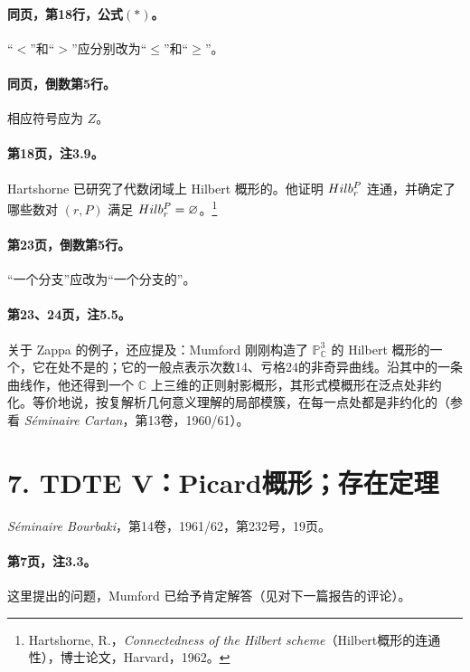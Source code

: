 \paragraph{同页，第18行，公式$(*)$。}“$<$”和“$>$”应分别改为“$\le$”和“$\ge$”。

\paragraph{同页，倒数第5行。}相应符号应为 $Z$。

\paragraph{第18页，注3.9。}Hartshorne 已研究了代数闭域上 Hilbert 概形的。他证明 $Hilb_r^P$ 连通，并确定了哪些数对 $(r,P)$ 满足 $Hilb_r^P=\varnothing$。\footnote{Hartshorne, R.，\textit{Connectedness of the Hilbert scheme}（Hilbert概形的连通性），博士论文，Harvard，1962。}

\paragraph{第23页，倒数第5行。}“一个分支”应改为“一个分支的”。

\paragraph{第23、24页，注5.5。}关于 Zappa 的例子，还应提及：Mumford 刚刚构造了 $\mathbb P^3_{\mathbb C}$ 的 Hilbert 概形的一个，它在处不是的；它的一般点表示次数14、亏格24的非奇异曲线。沿其中的一条曲线作，他还得到一个 $\mathbb C$ 上三维的正则射影概形，其形式模概形在泛点处非约化。等价地说，按复解析几何意义理解的局部模簇，在每一点处都是非约化的（参看 \textit{Séminaire Cartan}，第13卷，1960/61）。

\section*{7. TDTE V：Picard概形；存在定理}
\noindent\textit{Séminaire Bourbaki}，第14卷，1961/62，第232号，19页。

\paragraph{第7页，注3.3。}这里提出的问题，Mumford 已给予肯定解答（见对下一篇报告的评论）。

